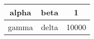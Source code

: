 \begin{table}
\centering
\begin{tabular}{ccc}
alpha 	 & beta 	 & 1 \\ \hline
gamma 	 & delta 	 & 10000 \\ \hline
 \hline
\end{tabular}
\end{table}